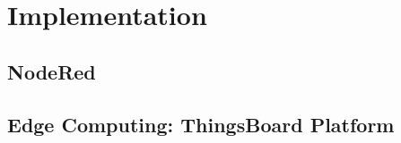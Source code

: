 \section{Implementation}

\subsection{NodeRed}

\clearpage
\subsection{Edge Computing: ThingsBoard Platform}

